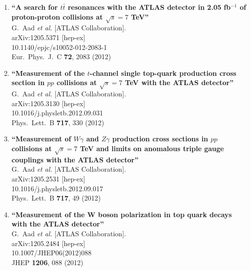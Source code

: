 \documentclass{article}
\begin{document}
\begin{enumerate}
\item%
{\bf ``A search for $t\bar{t}$ resonances with the ATLAS detector in 2.05 fb$^{-1}$ of proton-proton collisions at $\sqrt{s}=7$ TeV''}
  \\{}G.~Aad {\it et al.}  [ATLAS Collaboration].
  \\{}arXiv:1205.5371 [hep-ex]
    \\{}10.1140/epjc/s10052-012-2083-1
\\{}Eur.\ Phys.\ J.\ C {\bf 72}, 2083 (2012) %


\item%
{\bf ``Measurement of the $t$-channel single top-quark production cross section in $pp$ collisions at $\sqrt{s}=7$ TeV with the ATLAS detector''}
  \\{}G.~Aad {\it et al.}  [ATLAS Collaboration].
  \\{}arXiv:1205.3130 [hep-ex]
    \\{}10.1016/j.physletb.2012.09.031
\\{}Phys.\ Lett.\ B {\bf 717}, 330 (2012) %


\item%
{\bf ``Measurement of $W \gamma$ and $Z \gamma$ production cross sections in $pp$ collisions at $\sqrt{s}=7$ TeV and limits on anomalous triple gauge couplings with the ATLAS detector''}
  \\{}G.~Aad {\it et al.}  [ATLAS Collaboration].
  \\{}arXiv:1205.2531 [hep-ex]
    \\{}10.1016/j.physletb.2012.09.017
\\{}Phys.\ Lett.\ B {\bf 717}, 49 (2012) %


\item%
{\bf ``Measurement of the W boson polarization in top quark decays with the ATLAS detector''}
  \\{}G.~Aad {\it et al.}  [ATLAS Collaboration].
  \\{}arXiv:1205.2484 [hep-ex]
    \\{}10.1007/JHEP06(2012)088
\\{}JHEP {\bf 1206}, 088 (2012) %



\end{enumerate}
\end{document}
